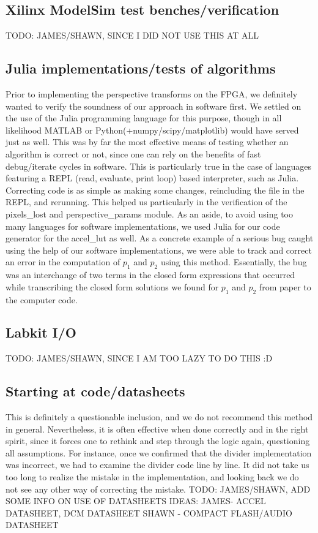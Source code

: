 \documentclass{article}
\begin{document}
\subsection{Xilinx ModelSim test benches/verification}
TODO: JAMES/SHAWN, SINCE I DID NOT USE THIS AT ALL

\subsection{Julia implementations/tests of algorithms}
Prior to implementing the perspective transforms on the FPGA,
we definitely wanted to verify the soundness of our approach in software first.
We settled on the use of the Julia programming language for this purpose,
though in all likelihood MATLAB or Python(+numpy/scipy/matplotlib) would have served just as well.
This was by far the most effective means of testing whether an algorithm is correct or not,
since one can rely on the benefits of fast debug/iterate cycles in software.
This is particularly true in the case of languages featuring a REPL (read, evaluate, print loop) based interpreter, such as Julia.
Correcting code is as simple as making some changes, reincluding the file in the REPL, and rerunning.
This helped us particularly in the verification of the pixels\_lost and perspective\_params module.
As an aside, to avoid using too many languages for software implementations,
we used Julia for our code generator for the accel\_lut as well.
As a concrete example of a serious bug caught using the help of our software implementations,
we were able to track and correct an error in the computation of $p_1$ and $p_2$ using this method.
Essentially, the bug was an interchange of two terms in the closed form expressions that occurred
while transcribing the closed form solutions we found for $p_1$ and $p_2$ from paper to the computer code.

\subsection{Labkit I/O}
TODO: JAMES/SHAWN, SINCE I AM TOO LAZY TO DO THIS :D

\subsection{Starting at code/datasheets}
This is definitely a questionable inclusion, and we do not recommend this method in general.
Nevertheless, it is often effective when done correctly and in the right spirit,
since it forces one to rethink and step through the logic again, questioning all assumptions.
For instance, once we confirmed that the divider implementation was incorrect,
we had to examine the divider code line by line.
It did not take us too long to realize the mistake in the implementation,
and looking back we do not see any other way of correcting the mistake.
TODO: JAMES/SHAWN, ADD SOME INFO ON USE OF DATASHEETS
IDEAS: JAMES- ACCEL DATASHEET, DCM DATASHEET
SHAWN - COMPACT FLASH/AUDIO DATASHEET
\end{document}

